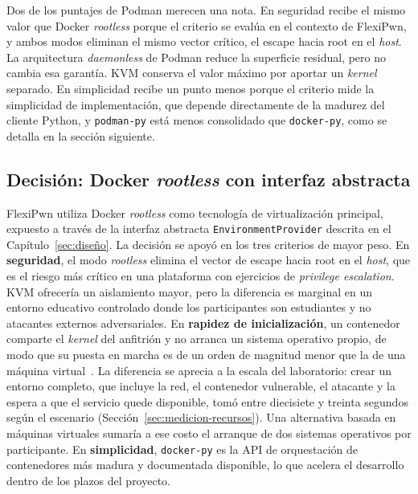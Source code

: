 Dos de los puntajes de Podman merecen una nota. En seguridad recibe el mismo
valor que Docker \textit{rootless} porque el criterio se evalúa en el contexto
de FlexiPwn, y ambos modos eliminan el mismo vector crítico, el escape hacia
root en el \textit{host}. La arquitectura \textit{daemonless} de Podman reduce
la superficie residual, pero no cambia esa garantía. KVM conserva el valor
máximo por aportar un \textit{kernel} separado. En simplicidad recibe un punto
menos porque el criterio mide la simplicidad de implementación, que depende
directamente de la madurez del cliente Python, y \texttt{podman-py} está menos
consolidado que \texttt{docker-py}, como se detalla en la sección siguiente.

\subsection{Decisión: Docker \textit{rootless} con interfaz abstracta}

FlexiPwn utiliza Docker \textit{rootless} como tecnología de virtualización
principal, expuesto a través de la interfaz abstracta
\texttt{EnvironmentProvider} descrita en el Capítulo~\ref{sec:diseño}. La
decisión se apoyó en los tres criterios de mayor peso. En \textbf{seguridad}, el
modo \textit{rootless} elimina el vector de escape hacia root en el
\textit{host}, que es el riesgo más crítico en una plataforma con ejercicios de
\textit{privilege escalation}. KVM ofrecería un aislamiento mayor, pero la
diferencia es marginal en un entorno educativo controlado donde los
participantes son estudiantes y no atacantes externos adversariales. En
\textbf{rapidez de inicialización}, un contenedor comparte el \textit{kernel}
del anfitrión y no arranca un sistema operativo propio, de modo que su puesta en
marcha es de un orden de magnitud menor que la de una máquina
virtual~\cite{felter-vm-containers}. La diferencia se aprecia a la escala del
laboratorio: crear un entorno completo, que incluye la red, el contenedor
vulnerable, el atacante y la espera a que el servicio quede disponible, tomó
entre diecisiete y treinta segundos según el escenario
(Sección~\ref{sec:medicion-recursos}). Una alternativa basada en máquinas
virtuales sumaría a ese costo el arranque de dos sistemas operativos por
participante. En \textbf{simplicidad}, \texttt{docker-py}
es la API de orquestación de contenedores más madura y documentada disponible,
lo que acelera el desarrollo dentro de los plazos del proyecto.

